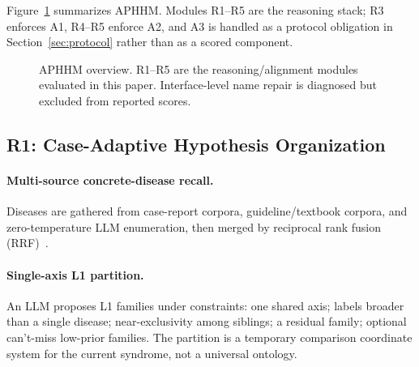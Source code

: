 Figure~\ref{fig:pipeline} summarizes APHHM.
Modules R1--R5 are the reasoning stack; R3 enforces A1, R4--R5 enforce A2, and A3 is handled as a protocol obligation in Section~\ref{sec:protocol} rather than as a scored component.

\begin{figure}[t]
\centering
{}
\caption{APHHM overview. R1--R5 are the reasoning/alignment modules evaluated in this paper. Interface-level name repair is diagnosed but excluded from reported scores.}
\label{fig:pipeline}
\end{figure}

\subsection{R1: Case-Adaptive Hypothesis Organization}
\label{sec:m1}

\paragraph{Multi-source concrete-disease recall.}
Diseases are gathered from case-report corpora, guideline/textbook corpora, and zero-temperature LLM enumeration, then merged by reciprocal rank fusion (RRF)~\cite{rrf2009}.

\paragraph{Single-axis L1 partition.}
An LLM proposes L1 families under constraints: one shared axis; labels broader than a single disease; near-exclusivity among siblings; a residual family; optional can't-miss low-prior families.
The partition is a temporary comparison coordinate system for the current syndrome, not a universal ontology.

